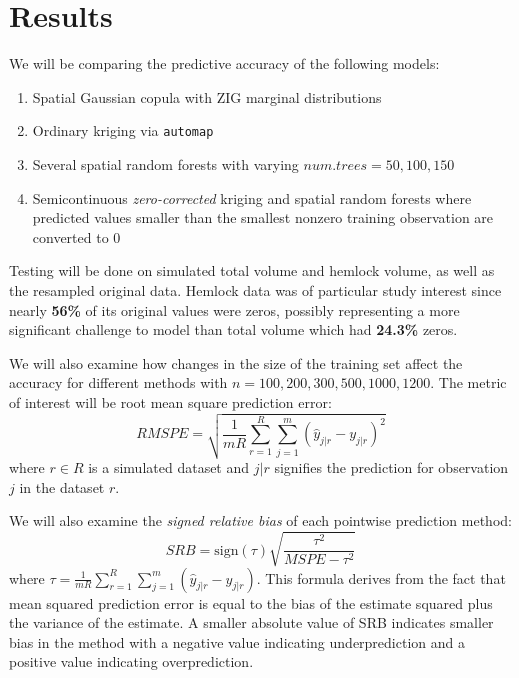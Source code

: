 \documentclass{article}
\begin{document}
\section{Results}
\begin{singlespace}
We will be comparing the predictive accuracy of the following models:
\begin{enumerate}
	\item Spatial Gaussian copula with ZIG marginal distributions
	\item Ordinary kriging via \texttt{automap}
	\item Several spatial random forests with varying $num.trees = 50, 100, 150$
	\item Semicontinuous \textit{zero-corrected} kriging and spatial random forests where predicted values smaller than the smallest nonzero training observation are converted to 0
\end{enumerate}
\end{singlespace}

Testing will be done on simulated total volume and hemlock volume, as well as the resampled original data.
Hemlock data was of particular study interest since nearly \textbf{56\%} of its original values were zeros, possibly representing a more significant challenge to model than total volume which had \textbf{24.3\%} zeros.

We will also examine how changes in the size of the training set affect the accuracy for different methods with $n = 100, 200, 300, 500, 1000, 1200$.
The metric of interest will be root mean square prediction error:
$$
RMSPE = \sqrt{\frac{1}{mR} \sum_{r=1}^R \sum_{j=1}^m (\hat{y}_{j|r} - y_{j|r})^2}
$$
where $r \in R$ is a simulated dataset and $j|r$ signifies the prediction for observation $j$ in the dataset $r$.

We will also examine the \textit{signed relative bias} of each pointwise prediction method:
$$
SRB = \text{sign}(\tau) \sqrt{\frac{\tau^2}{MSPE - \tau^2}}
$$
where $\tau = \frac{1}{mR} \sum_{r = 1}^R \sum_{j = 1}^m (\hat{y}_{j|r} - y_{j|r})$.
This formula derives from the fact that mean squared prediction error is equal to the bias of the estimate squared plus the variance of the estimate.
A smaller absolute value of SRB indicates smaller bias in the method with a negative value indicating underprediction and a positive value indicating overprediction.\cite{verhoef13}
\end{document}
